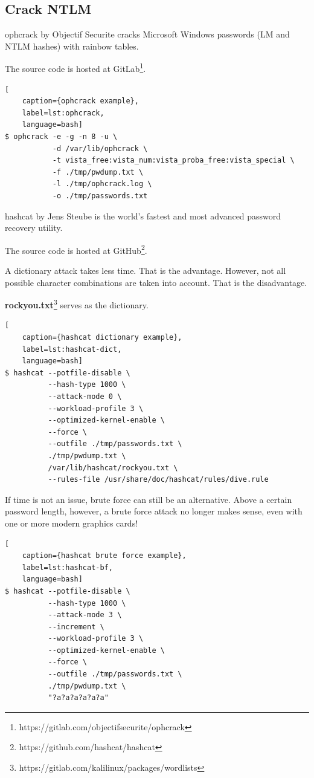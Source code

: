 \subsection{Crack NTLM}

ophcrack by Objectif Securite cracks Microsoft Windows passwords (LM and NTLM hashes) with rainbow tables.

The source code is hosted at GitLab\footnote{https://gitlab.com/objectifsecurite/ophcrack}.

\begin{lstlisting}[
    caption={ophcrack example},
    label=lst:ophcrack,
    language=bash]
$ ophcrack -e -g -n 8 -u \
           -d /var/lib/ophcrack \
           -t vista_free:vista_num:vista_proba_free:vista_special \
           -f ./tmp/pwdump.txt \
           -l ./tmp/ophcrack.log \
           -o ./tmp/passwords.txt
\end{lstlisting}

hashcat by Jens Steube is the world's fastest and most advanced password recovery utility.

The source code is hosted at GitHub\footnote{https://github.com/hashcat/hashcat}.

A dictionary attack takes less time. That is the advantage. However, not all possible character combinations are taken into account. That is the disadvantage.

\textbf{rockyou.txt}\footnote{https://gitlab.com/kalilinux/packages/wordlists} serves as the dictionary.

\begin{lstlisting}[
    caption={hashcat dictionary example},
    label=lst:hashcat-dict,
    language=bash]
$ hashcat --potfile-disable \
          --hash-type 1000 \
          --attack-mode 0 \
          --workload-profile 3 \
          --optimized-kernel-enable \
          --force \
          --outfile ./tmp/passwords.txt \
          ./tmp/pwdump.txt \
          /var/lib/hashcat/rockyou.txt \
          --rules-file /usr/share/doc/hashcat/rules/dive.rule
\end{lstlisting}

If time is not an issue, brute force can still be an alternative. Above a certain password length, however, a brute force attack no longer makes sense, even with one or more modern graphics cards!

\begin{lstlisting}[
    caption={hashcat brute force example},
    label=lst:hashcat-bf,
    language=bash]
$ hashcat --potfile-disable \
          --hash-type 1000 \
          --attack-mode 3 \
          --increment \
          --workload-profile 3 \
          --optimized-kernel-enable \
          --force \
          --outfile ./tmp/passwords.txt \
          ./tmp/pwdump.txt \
          "?a?a?a?a?a?a"
\end{lstlisting}

